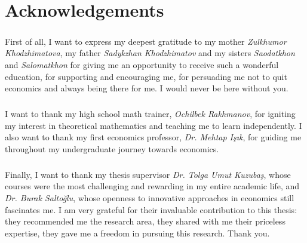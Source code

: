 \chapter*{Acknowledgements}
\vspace{20pt}
  \paragraph*{}First of all, I want to express my deepest gratitude to my mother \textit{Zulkhumor Khodzhimatova}, my father \textit{Sadykzhan Khodzhimatov} and my sisters \textit{Saodatkhon} and \textit{Salomatkhon} for giving me an opportunity to receive such a wonderful education, for supporting and encouraging me, for persuading me not to quit economics and always being there for me. I would never be here without you.
  \paragraph*{}I want to thank my high school math trainer, \textit{Ochilbek Rakhmanov}, for igniting my interest in theoretical mathematics and teaching me to learn independently. I also want to thank my first economics professor, \textit{Dr. Mehtap Işık}, for guiding me throughout my undergraduate journey towards economics.
  \paragraph*{}Finally, I want to thank my thesis supervisor \textit{Dr. Tolga Umut Kuzubaş}, whose courses were the most challenging and rewarding in my entire academic life, and \textit{Dr. Burak Saltoğlu}, whose openness to innovative approaches in economics still fascinates me. I am very grateful for their invaluable contribution to this thesis: they recommended me the research area, they shared with me their priceless expertise, they gave me a freedom in pursuing this research. Thank you.   
